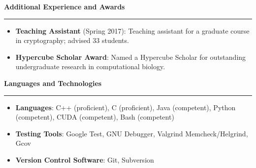 \documentclass[10pt,letterpaper]{article}
\begin{document}
\medskip

\begin{large}
    \textbf{Additional Experience and Awards}
\end{large}

\smallskip \hrule \smallskip

\begin{itemize}[topsep=0pt]
    \setlength\itemsep{-0.10em}
    \item \textbf{Teaching Assistant} (Spring 2017): Teaching assistant for a graduate course
        in cryptography; advised 33 students.
    \item \textbf{Hypercube Scholar Award}: Named a Hypercube Scholar for outstanding
        undergraduate research in computational biology.
\end{itemize}

\medskip

\begin{large}
    \textbf{Languages and Technologies}
\end{large}

\smallskip \hrule \smallskip

\begin{itemize}[topsep=0pt]
    \setlength\itemsep{-0.10em}
    \item \textbf{Languages}: C++ (proficient), C (proficient), Java (competent), Python (competent), CUDA (competent), Bash (competent)
    \item \textbf{Testing Tools}: Google Test, GNU Debugger, Valgrind Memcheck/Helgrind, Gcov
    \item \textbf{Version Control Software}: Git, Subversion
\end{itemize}
\end{document}
